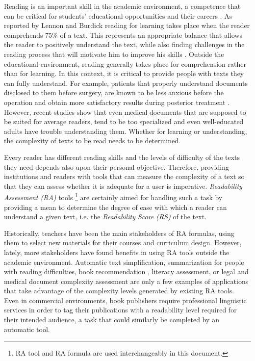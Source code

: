 \documentclass{bsu-ms}
\begin{document}
Reading is an important skill in the academic environment, a competence that can be critical for students' educational opportunities and their careers \cite{robinson2000issues}. As reported by Lennon and Burdick \cite{lennon2004lexile}  reading for learning takes place when the reader comprehends  75\% of a text. This represents an appropriate balance that allows the reader to positively understand the text, while also finding challenges in the reading process that will motivate  him to improve his skills \cite{lennon2004lexile}. Outside the educational environment, reading generally takes place for comprehension rather than for learning. In this context, it is critical to provide people with texts they can fully understand. For example, patients 
that properly understand documents disclosed to them before surgery, are known to be less anxious before the operation and obtain more satisfactory results during posterior treatment \cite{medicalReadability2}. However, recent studies\cite{medicalReadability1,medicalReadability2,medicalReadability3}  show that even medical documents that are supposed to be suited for average readers, tend to be too specialized and even well-educated adults have trouble understanding them.
Whether for learning or understanding, the complexity of texts to be read needs to be determined.


Every reader has different reading skills and the levels of difficulty of the texts they need depends also upon their personal objective. Therefore, providing institutions and readers with tools that can measure the complexity of a text so that they can assess whether it is adequate for a user is imperative. \textit{Readability Assessment (RA)} tools \footnote{RA tool and RA formula are used interchangeably in this document.}  are certainly aimed for handling such a task by providing a mean to determine the degree of ease with which a reader can understand a given text, i.e. the \textit{Readability Score (RS)} of the text.



 Historically, teachers have been the main stakeholders of RA formulas, using them to select new materials for their courses and curriculum design. However, lately, more stakeholders have found benefits in using RA tools outside the academic environment. Automatic text simplification\cite{textsimplification1,textsimplification2}, summarization for people with reading difficulties\cite{textsimplificationWithDisabilities1}, book recommendation \cite{pera2014automating}, literacy assessment\cite{literacy1}, or legal and medical document complexity assessment\cite{medicalReadability1,legalreadability,medicalReadability2,medicalReadability3}  are only a few examples of applications that take advantage of the complexity levels generated by existing RA tools. Even in commercial environments, book publishers require professional linguistic services in order to tag their publications with a readability level required for their intended audience, a task that could similarly be completed by an automatic tool.
\end{document}

